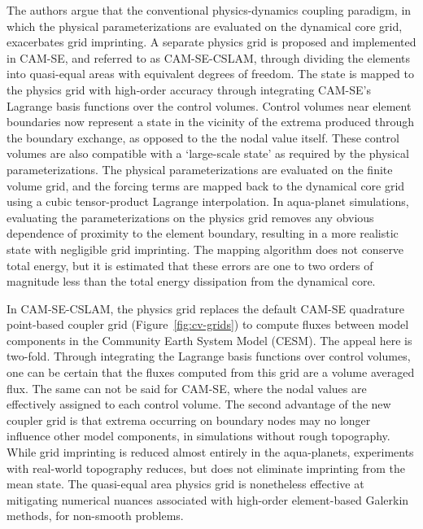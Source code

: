 \documentclass[twocol]{ametsoc}
\begin{document}
The authors argue that the conventional physics-dynamics coupling paradigm, in which the physical parameterizations are evaluated on the dynamical core grid, exacerbates grid imprinting. A separate physics grid is proposed and implemented in CAM-SE, and referred to as CAM-SE-CSLAM, through dividing the elements into quasi-equal areas with equivalent degrees of freedom. The state is mapped to the physics grid with high-order accuracy through integrating CAM-SE's Lagrange basis functions over the control volumes. Control volumes near element boundaries now represent a state in the vicinity of the extrema produced through the boundary exchange, as opposed to the the nodal value itself. These control volumes are also compatible with a `large-scale state' as required by the physical parameterizations. The physical parameterizations are evaluated on the finite volume grid, and the forcing terms are mapped back to the dynamical core grid using a cubic tensor-product Lagrange interpolation. In aqua-planet simulations, evaluating the parameterizations on the physics grid removes any obvious dependence of proximity to the element boundary, resulting in a more realistic state with negligible grid imprinting. The mapping algorithm does not conserve total energy, but it is estimated that these errors are one to two orders of magnitude less than the total energy dissipation from the dynamical core.

In CAM-SE-CSLAM, the physics grid replaces the default CAM-SE quadrature point-based coupler grid (Figure~\ref{fig:cv-grids}) to compute fluxes between model components in the Community Earth System Model (CESM). The appeal here is two-fold. Through integrating the Lagrange basis functions over control volumes, one can be certain that the fluxes computed from this grid are a volume averaged flux. The same can not be said for CAM-SE, where the nodal values are effectively assigned to each control volume. The second advantage of the new coupler grid is that extrema occurring on boundary nodes may no longer influence other model components, in simulations without rough topography. While grid imprinting is reduced almost entirely in the aqua-planets, experiments with real-world topography reduces, but does not eliminate imprinting from the mean state. The quasi-equal area physics grid is nonetheless effective at mitigating numerical nuances associated with high-order element-based Galerkin methods, for non-smooth problems.  
\end{document}
